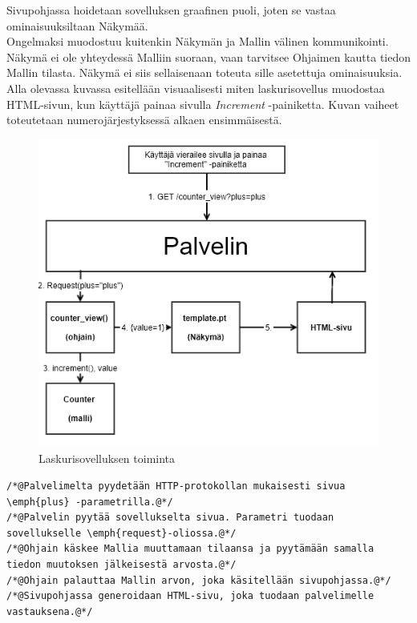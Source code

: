 \documentclass[utf8]{gradu3}
\begin{document}
Sivupohjassa hoidetaan sovelluksen graafinen puoli, joten se vastaa ominaisuuksiltaan Näkymää. \\ Ongelmaksi muodostuu kuitenkin Näkymän ja Mallin välinen kommunikointi. Näkymä ei ole yhteydessä Malliin suoraan, vaan tarvitsee Ohjaimen kautta tiedon Mallin tilasta.  Näkymä ei siis sellaisenaan toteuta sille asetettuja ominaisuuksia. \\

Alla olevassa kuvassa esitellään visuaalisesti miten laskurisovellus muodostaa HTML-sivun, kun käyttäjä painaa sivulla \emph{Increment} -painiketta. Kuvan
vaiheet toteutetaan numerojärjestyksessä alkaen ensimmäisestä.
\begin{figure}[h]
\centering
\includegraphics[scale=0.7]{laskurisovellus.png}
\caption{Laskurisovelluksen toiminta}
\end{figure}

\begin{lstlisting}
/*@Palvelimelta pyydetään HTTP-protokollan mukaisesti sivua \emph{plus} -parametrilla.@*/
/*@Palvelin pyytää sovellukselta sivua. Parametri tuodaan sovellukselle \emph{request}-oliossa.@*/
/*@Ohjain käskee Mallia muuttamaan tilaansa ja pyytämään samalla tiedon muutoksen jälkeisestä arvosta.@*/
/*@Ohjain palauttaa Mallin arvon, joka käsitellään sivupohjassa.@*/
/*@Sivupohjassa generoidaan HTML-sivu, joka tuodaan palvelimelle vastauksena.@*/
\end{lstlisting}
\end{document}
